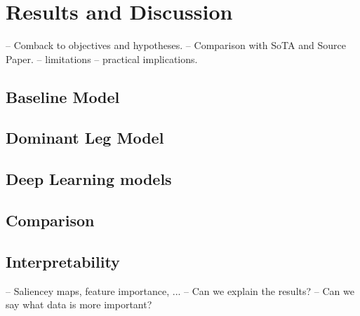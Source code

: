 \chapter{Results and Discussion}\label{chap:results-discussion}
-- Comback to objectives and hypotheses.
-- Comparison with SoTA and Source Paper.
-- limitations
-- practical implications.

\section{Baseline Model}\label{sec:results-baselines}

\section{Dominant Leg Model}\label{sec:results-dominant-leg}  %

\section{Deep Learning models}\label{sec:results-deep-learning}

\section{Comparison}\label{sec:results-comparison}

\section{Interpretability}\label{sec:results-interpretability}
-- Saliencey maps, feature importance, ...
-- Can we explain the results?
-- Can we say what data is more important?